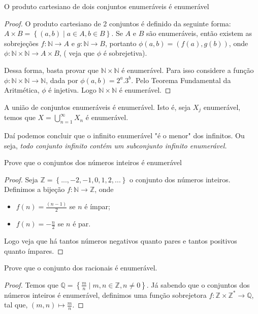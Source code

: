 \begin{corol}
O produto cartesiano de dois conjuntos enumeráveis é enumerável
\end{corol}

\begin{proof}
O produto cartesiano de 2 conjuntos é definido da seguinte forma: $A\times B=\left \{ (a,b) \mid a \in A, b \in B \right \}$. Se $A$ e $B$ são enumeráveis, então existem as sobrejeções $f:\mathbb{N}\rightarrow A$ e $g:\mathbb{N}\rightarrow B$, portanto $\phi (a,b)=(f(a),g(b))$, onde $\phi: \mathbb{N}\times \mathbb{N}\rightarrow A\times B$, ( veja que $\phi$ é sobrejetiva).

Dessa forma, basta provar que $\mathbb{N}\times \mathbb{N}$ é enumerável. Para isso considere a função $\phi:\mathbb{N}\times \mathbb{N} \rightarrow \mathbb{N}$, dada por $\phi(a,b)=2^{a}.3^{b}$. Pelo Teorema Fundamental da Aritmética, $\phi$ é injetiva. Logo $\mathbb{N}\times \mathbb{N}$ é enumerável.
\end{proof}

\begin{corol}
A união de conjuntos enumeráveis é enumerável. Isto é, seja $X_{j}$ enumerável, temos que $X=\bigcup_{n=1}^{\infty }X_{n}$ é enumerável.
\end{corol}

Daí podemos concluir que o infinito enumerável "é o menor" dos infinitos. Ou seja, \textit{todo conjunto infinito contém um subconjunto infinito enumerável.}

\begin{prob}
Prove que o conjuntos dos números inteiros é enumerável
\end{prob}

\begin{proof}
Seja $\mathbb{Z}=\left \{ ...,-2,-1,0,1,2,... \right \}$ o conjunto dos números inteiros. Definimos a bijeção $f:\mathbb{N}\rightarrow \mathbb{Z}$, onde \begin{itemize}
    \item $f(n)=\frac{(n-1)}{2}$ se $n$ é ímpar;
    \item $f(n)=-\frac{n}{2}$ se $n$ é par.
\end{itemize}
Logo veja que há tantos números negativos quanto pares e tantos positivos quanto ímpares.
\end{proof}

\begin{prob}
Prove que o conjunto dos racionais é enumerável.
\end{prob}
\begin{proof}
Temos que $\mathbb{Q}=\left \{ \frac{m}{n} \mid m,n \in \mathbb{Z}, n \neq 0 \right \}$. Já sabendo que o conjuntos dos números inteiros é enumerável, definimos uma função sobrejetora $f:\mathbb{Z}\times \mathbb{Z}^{\ast }\rightarrow \mathbb{Q}$, tal que, $(m,n)\mapsto \frac{m}{n}$.
\end{proof}